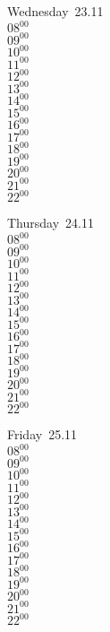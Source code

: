 \documentclass[11pt,a4paper]{book}\usepackage[]{graphicx}\usepackage[]{color}
\begin{document}
\begin{weekdaybox}
  Wednesday~23.11\\
  { 
  \vfill
  $08^{00}$\\
$09^{00}$\\
$10^{00}$\\
$11^{00}$\\
$12^{00}$\\
$13^{00}$\\
$14^{00}$\\
$15^{00}$\\
$16^{00}$\\
$17^{00}$\\
$18^{00}$\\
$19^{00}$\\
$20^{00}$\\
$21^{00}$\\
$22^{00}$\\
  }
\end{weekdaybox}
\clearpage
\begin{headerbox}
\end{headerbox}
\begin{weekdaybox}
  Thursday~24.11\\
  { 
  \vfill
  $08^{00}$\\
$09^{00}$\\
$10^{00}$\\
$11^{00}$\\
$12^{00}$\\
$13^{00}$\\
$14^{00}$\\
$15^{00}$\\
$16^{00}$\\
$17^{00}$\\
$18^{00}$\\
$19^{00}$\\
$20^{00}$\\
$21^{00}$\\
$22^{00}$\\
  }
\end{weekdaybox} 
\begin{weekdaybox}
  Friday~25.11\\
  { 
  \vfill
  $08^{00}$\\
$09^{00}$\\
$10^{00}$\\
$11^{00}$\\
$12^{00}$\\
$13^{00}$\\
$14^{00}$\\
$15^{00}$\\
$16^{00}$\\
$17^{00}$\\
$18^{00}$\\
$19^{00}$\\
$20^{00}$\\
$21^{00}$\\
$22^{00}$\\
  }
\end{weekdaybox}
\end{document}

